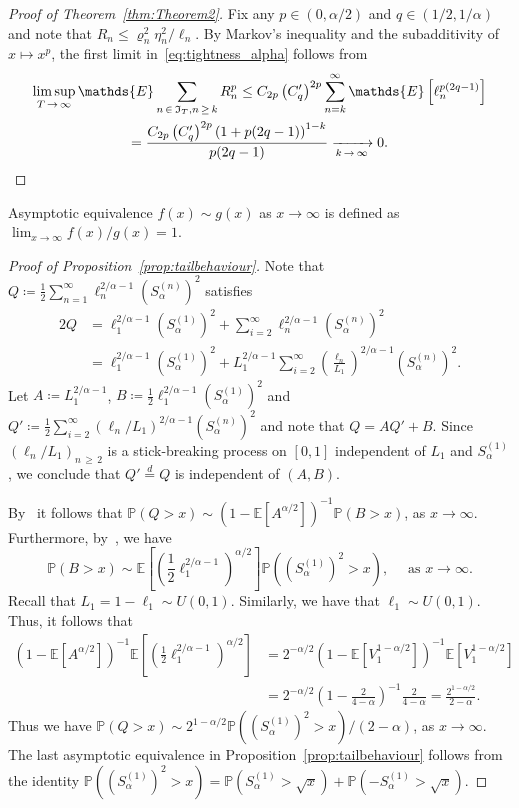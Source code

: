\documentclass[AHL,Unicode,longabstracts,published]{cedram}
\newcommand\E{\mathds{E}}
\newcommand\p{\mathds{P}}
\newcommand\1{\mathds{1}}
\newcommand\GI{\mathfrak{I}}
\newcommand\eqd{\overset{d}{=}}
\begin{document}
\begin{proof}[Proof of Theorem~\ref{thm:Theorem2}]
Fix any $p\in(0,\alpha/2)$ and $q\in(1/2,1/\alpha)$ and note that $R_n\le\varrho_n^2\eta_n^2/\ell_n$. By Markov's inequality and the subadditivity of $x\mapsto x^p$, the first limit in~\eqref{eq:tightness_alpha} follows from
\begin{multline*}
\limsup_{T\,\to\,\infty}\E\sum_{n\,\in\,\GI_T,n\,\ge\,k}R_n^p \le C_{2p}\left(C'_{q}\right)^{2p}\sum_{n=k}^\infty\E\left[\ell_n^{p(2q-1)}\right]\\
=\frac{C_{2p}\left(C'_{q}\right)^{2p}\left(1+p(2q-1)\right)^{1-k}}{p(2q-1)}
\xrightarrow[k\,\to\,\infty]{}0.
\qedhere
\end{multline*}
\end{proof}

Asymptotic equivalence $f(x)\sim g(x)$ as $x\to\infty$ is defined as $\lim_{x\to\infty}f(x)/g(x)=1$.

\begin{proof}[Proof of Proposition~\ref{prop:tailbehaviour}]
Note that $Q\coloneqq \frac{1}{2}\sum_{n=1}^\infty \ell_n^{2/\alpha-1}(S_\alpha^{(n)})^2$ satisfies
\begin{align*}
2Q &=\ell_1^{2/\alpha-1}\left(S_\alpha^{(1)}\right)^2+\sum_{i=2}^\infty \ell_n^{2/\alpha-1}\left(S_\alpha^{(n)}\right)^2 \\
&= \ell_1^{2/\alpha-1}\left(S_\alpha^{(1)}\right)^2+L_1^{2/\alpha-1}\sum_{i=2}^\infty \left(\frac{\ell_n}{L_1}\right)^{2/\alpha-1}\left(S_\alpha^{(n)}\right)^2.
\end{align*}
Let $A\coloneqq L_1^{2/\alpha-1}$, $B\coloneqq\frac{1}{2}\ell_1^{2/\alpha-1}(S_\alpha^{(1)})^2$ and $Q'\coloneqq\frac{1}{2}\sum_{i=2}^\infty (\ell_n/L_1)^{2/\alpha-1}(S_\alpha^{(n)})^2$ and note that $Q=AQ'+B$. Since $(\ell_n/L_1)_{n\,\ge\,2}$ is a stick-breaking process on $[0,1]$ independent of $L_1$ and $S_\alpha^{(1)}$, we conclude that $Q'\eqd Q$ is independent of $(A,B)$.

By~\cite[Theorem~2.4.3]{PerpetuityBook} it follows that $\p(Q>x)\sim(1-\E[A^{\alpha/2}])^{-1}\p(B>x)$, as $x\to\infty$. Furthermore, by~\cite[Lemma~B.5.1]{PerpetuityBook}, we have
\[
\p(B>x)\sim
\E\left[\left(\frac{1}{2}\ell_1^{2/\alpha-1}
\right)^{\alpha/2}\right]
\p\left(\left(S_\alpha^{(1)}\right)^2>x\right),
\quad\text{ as } x \to \infty.
\]
Recall that $L_1 =1-\ell_1\sim U(0,1)$. Similarly, we have that $\ell_1\sim U(0,1)$. Thus, it follows that
\begin{align*}
\left(1-\E \left[A^{\alpha/2}\right]\right)^{-1}
\E\left[\left(\frac{1}{2}\ell_1^{2/\alpha-1}
\right)^{\alpha/2}\right] &=2^{-\alpha/2}\left(1-\E\left[V_1^{1-\alpha/2}
\right]\right)^{-1}
\E\left[V_1^{1-\alpha/2}\right]\\
&=2^{-\alpha/2}\left(1-\frac{2}{4-\alpha}\right)^{-1}
\frac{2}{4-\alpha} =\frac{2^{1-\alpha/2}}{2-\alpha}.
\end{align*}
Thus we have $\p(Q>x)\sim 2^{1-\alpha/2} \p ((S_\alpha^{(1)})^2>x)/(2-\alpha)$, as $x\to\infty$. The last asymptotic equivalence in Proposition~\ref{prop:tailbehaviour} follows from the identity $\p((S_\alpha^{(1)})^2>x) =\p (S_\alpha^{(1)}>\sqrt{x})+\p (-S_\alpha^{(1)}>\sqrt{x})$.
\end{proof}
\end{document}
